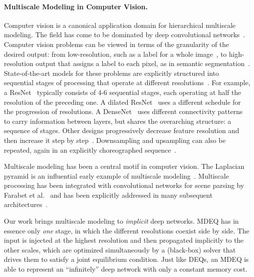 \documentclass{article}
\begin{document}
\paragraph{Multiscale Modeling in Computer Vision.} Computer vision is a canonical application domain for hierarchical multiscale modeling. The field has come to be dominated by deep convolutional networks~\cite{LeCun1989,krizhevsky2012imagenet}. Computer vision problems can be viewed in terms of the granularity of the desired output: from low-resolution, such as a label for a whole image~\cite{deng2009imagenet}, to high-resolution output that assigns a label to each pixel, as in semantic segmentation~\cite{Shelhamer2017,chen2017deeplab,dilatedConv,zhao2017pyramid}.
State-of-the-art models for these problems are explicitly structured into sequential stages of processing that operate at different resolutions~\cite{krizhevsky2012imagenet,szegedy2015going,simonyan2015very,he2016deep}.
For example, a ResNet~\cite{he2016deep} typically consists of 4-6 sequential stages, each operating at half the resolution of the preceding one.
A dilated ResNet~\cite{yu2017dilated} uses a different schedule for the progression of resolutions.
A DenseNet~\cite{huang2017densely} uses different connectivity patterns to carry information between layers, but shares the overarching structure: a sequence of stages.
Other designs progressively decrease feature resolution and then increase it step by step~\cite{ronneberger2015u}.
Downsampling and upsampling can also be repeated, again in an explicitly choreographed sequence~\cite{newell2016stacked,Sun2018FishNet}.

Multiscale modeling has been a central motif in computer vision. The Laplacian pyramid is an influential early example of multiscale modeling~\cite{burt1983laplacian}. Multiscale processing has been integrated with convolutional networks for scene parsing by Farabet et al.~\cite{farabet2012learning} and has been explicitly addressed in many subsequent architectures~\cite{Shelhamer2017,chen2017deeplab,dilatedConv,Chen2016attention,Lin2017,zhao2017pyramid,huang2018multi,Chen2018searching,sun2019high}.

Our work brings multiscale modeling to \emph{implicit} deep networks. MDEQ has in essence only \emph{one} stage, in which the different resolutions coexist side by side. The input is injected at the highest resolution and then propagated implicitly to the other scales, which are optimized simultaneously by a (black-box) solver that drives them to satisfy a joint equilibrium condition. Just like DEQs, an MDEQ is able to represent an ``infinitely'' deep network with only a constant memory cost.
\end{document}
